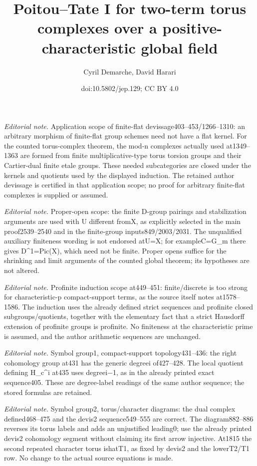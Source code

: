 \documentclass[10pt,a4paper]{amsart}
\title{Poitou–Tate I for two-term torus complexes over a positive-characteristic global field}
\author{Cyril Demarche, David Harari}
\date{doi:10.5802/jep.129; CC BY 4.0}
\theoremstyle{plain}
\theoremstyle{definition}
\begin{document}
\maketitle
\noindent\textit{Editorial note.} Application scope of finite-flat devissage403–453/1266–1310: an arbitrary morphism of finite-flat group schemes need not have a flat kernel. For the counted torus-complex theorem, the mod-n complexes actually used at1349–1363 are formed from finite multiplicative-type torus torsion groups and their Cartier-dual finite etale groups. These needed subcategories are closed under the kernels and quotients used by the displayed induction. The retained author devissage is certified in that application scope; no proof for arbitrary finite-flat complexes is supplied or assumed.\par\medskip
\noindent\textit{Editorial note.} Proper-open scope: the finite D-group pairings and stabilization arguments are used with U different fromX, as explicitly selected in the main proof2539–2540 and in the finite-group inputs849/2003/2031. The unqualified auxiliary finiteness wording is not endorsed atU=X; for exampleC=G\_m there gives D\textasciicircum{}1=Pic(X), which need not be finite. Proper opens suffice for the shrinking and limit arguments of the counted global theorem; its hypotheses are not altered.\par\medskip
\noindent\textit{Editorial note.} Profinite induction scope at449–451: finite/discrete is too strong for characteristic-p compact-support terms, as the source itself notes at1578–1586. The induction uses the already defined strict sequences and profinite closed subgroups/quotients, together with the elementary fact that a strict Hausdorff extension of profinite groups is profinite. No finiteness at the characteristic prime is assumed, and the author arithmetic sequences are unchanged.\par\medskip
\noindent\textit{Editorial note.} Symbol group1, compact-support topology431–436: the right cohomology group at431 has the generic degreei of427–428. The local quotient defining H\_c\textasciicircum{}i at435 uses degreei−1, as in the already printed exact sequence405. These are degree-label readings of the same author sequence; the stored formulas are retained.\par\medskip
\noindent\textit{Editorial note.} Symbol group2, torus/character diagrams: the dual complex defined468–475 and the devis2 sequence549–555 are correct. The diagram882–886 reverses its torus labels and adds an unjustified leading0; use the already printed devis2 cohomology segment without claiming its first arrow injective. At1815 the second repeated character torus ishatT1, as fixed by devis2 and the lowerT2/T1 row. No change to the actual source equations is made.\par\medskip
\end{document}
